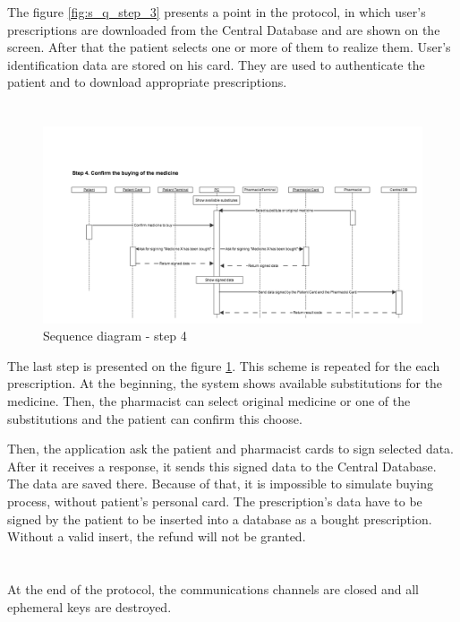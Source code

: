 The figure \ref{fig:s_q_step_3} presents a point in the protocol, in which user's prescriptions are downloaded from the Central Database and are shown on the screen. After that the patient selects one or more of them to realize them.  User's identification data are stored on his card. They are used to authenticate the patient and to download appropriate prescriptions. 

\section{}
\begin{figure}	
	\hspace*{-1.5in}
    \includegraphics[scale=0.45]{s_d_4.png}
    \caption{Sequence diagram - step 4}
    \label{fig:s_q_step_4}
\end{figure} 

The last step is presented on the figure \ref{fig:s_q_step_4}. This scheme is repeated for the each prescription. At the beginning, the system shows available substitutions for the medicine. Then, the pharmacist can select original medicine or one of the substitutions and the patient can confirm this choose. 

Then, the application ask the patient and pharmacist cards to sign selected data. After it receives a response, it sends this signed data to the Central Database. The data are saved there. Because of that, it is  impossible to simulate buying process, without patient's personal card. The prescription's data have to be signed by the patient to be inserted into a database as a  bought prescription. Without a valid insert, the refund will not be granted. 

\section{}
At the end of the protocol, the communications channels are closed and all ephemeral keys are destroyed.



